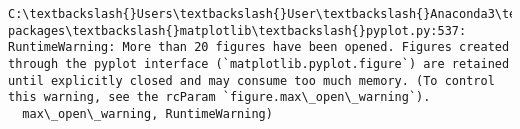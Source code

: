 \documentclass[11pt]{article}
\begin{document}
    \begin{Verbatim}[commandchars=\\\{\}]
C:\textbackslash{}Users\textbackslash{}User\textbackslash{}Anaconda3\textbackslash{}lib\textbackslash{}site-packages\textbackslash{}matplotlib\textbackslash{}pyplot.py:537: RuntimeWarning: More than 20 figures have been opened. Figures created through the pyplot interface (`matplotlib.pyplot.figure`) are retained until explicitly closed and may consume too much memory. (To control this warning, see the rcParam `figure.max\_open\_warning`).
  max\_open\_warning, RuntimeWarning)

    \end{Verbatim}

    \begin{center}
    \end{center}
    { \hspace*{\fill} \\}
    
    \begin{center}
    \end{center}
    { \hspace*{\fill} \\}
    
    \begin{center}
    \end{center}
    { \hspace*{\fill} \\}
    
    \begin{center}
    \end{center}
    { \hspace*{\fill} \\}
    
    \begin{center}
    \end{center}
    { \hspace*{\fill} \\}
    
    \begin{center}
    \end{center}
    { \hspace*{\fill} \\}
    
\end{document}
